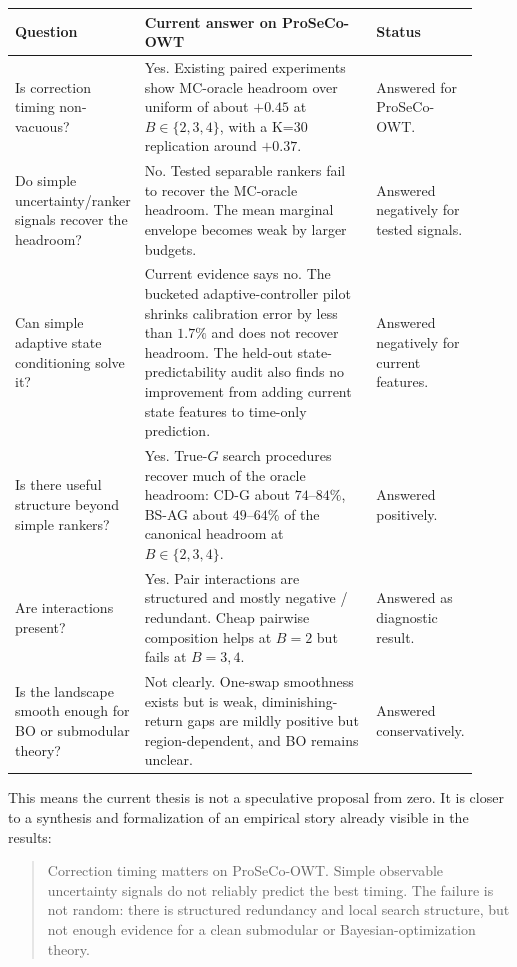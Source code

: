 \documentclass[11pt]{article}
\begin{document}
\begin{center}
\small
\begin{tabular}{p{0.20\linewidth}p{0.51\linewidth}p{0.21\linewidth}}
\toprule
Question & Current answer on ProSeCo-OWT & Status \\
\midrule
Is correction timing non-vacuous? &
Yes.  Existing paired experiments show MC-oracle headroom over uniform of
about \(+0.45\) at \(B\in\{2,3,4\}\), with a K=30 replication around \(+0.37\). &
Answered for ProSeCo-OWT. \\
\addlinespace
Do simple uncertainty/ranker signals recover the headroom? &
No.  Tested separable rankers fail to recover the MC-oracle headroom.  The
mean marginal envelope becomes weak by larger budgets. &
Answered negatively for tested signals. \\
\addlinespace
Can simple adaptive state conditioning solve it? &
Current evidence says no.  The bucketed adaptive-controller pilot shrinks
calibration error by less than \(1.7\%\) and does not recover headroom.  The
held-out state-predictability audit also finds no improvement from adding
current state features to time-only prediction. &
Answered negatively for current features. \\
\addlinespace
Is there useful structure beyond simple rankers? &
Yes.  True-\(G\) search procedures recover much of the oracle headroom:
CD-G about \(74\)--\(84\%\), BS-AG about \(49\)--\(64\%\) of the canonical
headroom at \(B\in\{2,3,4\}\). &
Answered positively. \\
\addlinespace
Are interactions present? &
Yes.  Pair interactions are structured and mostly negative / redundant.
Cheap pairwise composition helps at \(B=2\) but fails at \(B=3,4\). &
Answered as diagnostic result. \\
\addlinespace
Is the landscape smooth enough for BO or submodular theory? &
Not clearly.  One-swap smoothness exists but is weak, diminishing-return gaps
are mildly positive but region-dependent, and BO remains unclear. &
Answered conservatively. \\
\bottomrule
\end{tabular}
\end{center}

\noindent
This means the current thesis is not a speculative proposal from zero.  It is
closer to a synthesis and formalization of an empirical story already visible
in the results:

\begin{quote}
Correction timing matters on ProSeCo-OWT.  Simple observable uncertainty
signals do not reliably predict the best timing.  The failure is not random:
there is structured redundancy and local search structure, but not enough
evidence for a clean submodular or Bayesian-optimization theory.
\end{quote}
\end{document}
